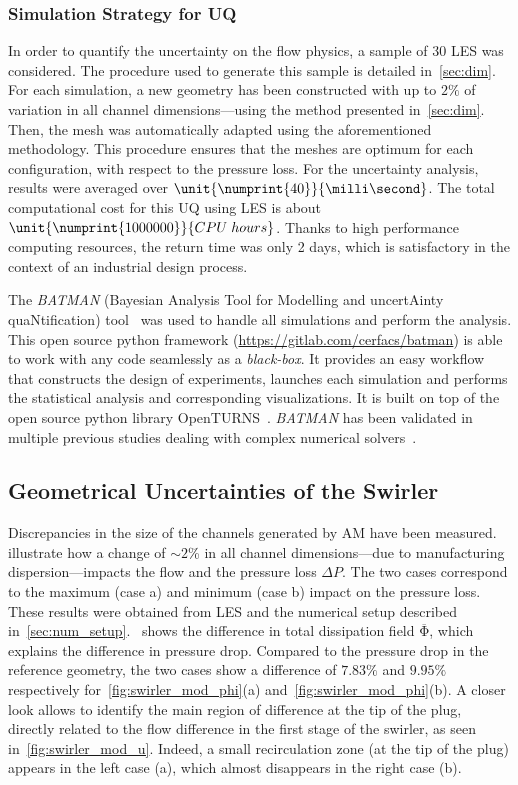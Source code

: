 \subsubsection{Simulation Strategy for UQ}

In order to quantify the uncertainty on the flow physics, a sample of 30 LES was considered. The procedure used to generate this sample is detailed in~\cref{sec:dim}. For each simulation, a new geometry has been constructed with up to $2\%$ of variation in all channel dimensions---using the method presented in~\cref{sec:dim}. Then, the mesh was automatically adapted using the aforementioned methodology. This procedure ensures that the meshes are optimum for each configuration, with respect to the pressure loss. For the uncertainty analysis, results were averaged over $\unit{\numprint{40}}{\milli\second}$. The total computational cost for this UQ using LES is about $\unit{\numprint{1000000}}{CPU\;hours}$. Thanks to high performance computing resources, the return time was only 2 days, which is satisfactory in the context of an industrial design process.

The \textit{BATMAN} (Bayesian Analysis Tool for Modelling and uncertAinty quaNtification) tool~\cite{Roy2018} was used to handle all simulations and perform the analysis. This open source python framework (\url{https://gitlab.com/cerfacs/batman}) is able to work with any code seamlessly as a \textit{black-box}. It provides an easy workflow that constructs the design of experiments, launches each simulation and performs the statistical analysis and corresponding visualizations. It is built on top of the open source python library OpenTURNS~\cite{Baudin2015a}. \textit{BATMAN} has been validated in multiple previous studies dealing with complex numerical solvers~\cite{Roy2017b,Roy2018a}.

\subsection{Geometrical Uncertainties of the Swirler}

Discrepancies in the size of the channels generated by AM have been measured.  illustrate how a change of $\sim2$\% in all channel dimensions---due to manufacturing dispersion---impacts the flow and the pressure loss $\Delta P$. The two cases correspond to the maximum (case a) and minimum (case b) impact on the pressure loss. These results were obtained from LES and the numerical setup described in~\cref{sec:num_setup}.
~shows the difference in total dissipation field $\mathrm{\overline{\Phi}}$, which explains the difference in pressure drop.%
Compared to the pressure drop in the reference geometry, the two cases show a difference of $7.83\%$ and $9.95\%$ respectively for~\cref{fig:swirler_mod_phi}(a) and~\cref{fig:swirler_mod_phi}(b). 
A closer look allows to identify the main region of difference at the tip of the plug, directly related to the flow difference in the first stage of the swirler, as seen in~\cref{fig:swirler_mod_u}. Indeed, a small recirculation zone (at the tip of the plug) appears in the left case (a), which almost disappears in the right case (b).


